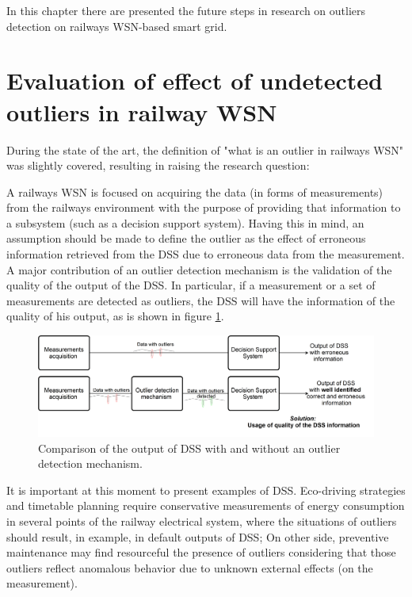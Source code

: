 In this chapter there are presented the future steps in research on outliers detection on railways WSN-based smart grid.


\section{Evaluation of effect of undetected outliers in railway WSN}


During the state of the art, the definition of "what is an outlier in railways WSN" was slightly covered, resulting in raising the research question:
	
	
\vspace{0.5em}
{}\par
\vspace{1.5em}

A railways WSN is focused on acquiring the data (in forms of measurements) from the railways environment with the purpose of providing that information to a subsystem (such as a decision support system). Having this in mind, an assumption should be made to define the outlier as the effect of erroneous information retrieved from the DSS due to erroneous data from the measurement. A major contribution of an outlier detection mechanism is the validation of the quality of the output of the DSS. In particular, if a measurement or a set of measurements are detected as outliers, the DSS will have the information of the quality of his output, as is shown in figure \ref{fig:evaluation}.

\begin{figure}[h!]
	\centering
	\includegraphics[width=1.03\textwidth,keepaspectratio]{figures/evaluation}
	\caption{Comparison of the output of DSS with and without an outlier detection mechanism. }
	\label{fig:evaluation}
\end{figure}

It is important at this moment to present examples of DSS. Eco-driving strategies and timetable planning require conservative measurements of energy consumption in several points of the railway electrical system, where the situations of outliers should result, in example, in default outputs of DSS; On other side, preventive maintenance may find resourceful the presence of outliers considering that those outliers reflect anomalous behavior due to unknown external effects (on the measurement).

